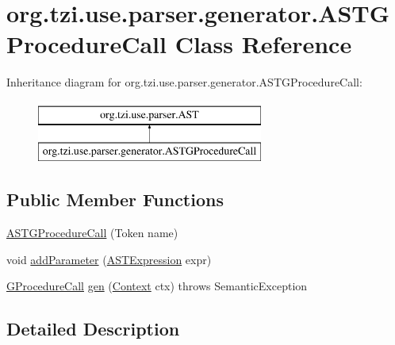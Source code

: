 \hypertarget{classorg_1_1tzi_1_1use_1_1parser_1_1generator_1_1_a_s_t_g_procedure_call}{\section{org.\-tzi.\-use.\-parser.\-generator.\-A\-S\-T\-G\-Procedure\-Call Class Reference}
\label{classorg_1_1tzi_1_1use_1_1parser_1_1generator_1_1_a_s_t_g_procedure_call}
}
Inheritance diagram for org.\-tzi.\-use.\-parser.\-generator.\-A\-S\-T\-G\-Procedure\-Call\-:\begin{figure}[H]
\begin{center}
\leavevmode
\includegraphics[height=2.000000cm]{classorg_1_1tzi_1_1use_1_1parser_1_1generator_1_1_a_s_t_g_procedure_call}
\end{center}
\end{figure}
\subsection*{Public Member Functions}
\begin{DoxyCompactItemize}
\item 
\hyperlink{classorg_1_1tzi_1_1use_1_1parser_1_1generator_1_1_a_s_t_g_procedure_call_ae195d8fec181a1c8280de57203f3b4a8}{A\-S\-T\-G\-Procedure\-Call} (Token name)
\item 
void \hyperlink{classorg_1_1tzi_1_1use_1_1parser_1_1generator_1_1_a_s_t_g_procedure_call_a36d9c6e1dbb06ff924c0941c9685445a}{add\-Parameter} (\hyperlink{classorg_1_1tzi_1_1use_1_1parser_1_1ocl_1_1_a_s_t_expression}{A\-S\-T\-Expression} expr)
\item 
\hyperlink{classorg_1_1tzi_1_1use_1_1gen_1_1tool_1_1_g_procedure_call}{G\-Procedure\-Call} \hyperlink{classorg_1_1tzi_1_1use_1_1parser_1_1generator_1_1_a_s_t_g_procedure_call_a6f0af37ce039cf5c4775a91917fb33e3}{gen} (\hyperlink{classorg_1_1tzi_1_1use_1_1parser_1_1_context}{Context} ctx)  throws Semantic\-Exception 
\end{DoxyCompactItemize}


\subsection{Detailed Description}


